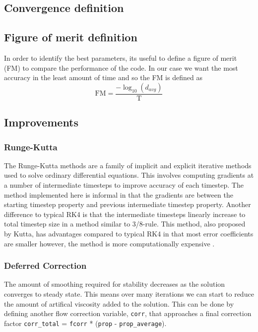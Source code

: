 \documentclass{article}
\begin{document}
\subsection{Convergence definition}

\subsection{Figure of merit definition}
In order to identify the best parameters, its useful to define a figure of merit (FM) to compare the performance of the code.
In our case we want the most accuracy in the least amount of time and so the FM is defined as
\begin{equation}
    \text{FM} = \frac{-\log_{10}(d_{avg})}{\text{T}}
\end{equation}

\subsection{Improvements}
\subsubsection{Runge-Kutta}

The Runge-Kutta methods are a family of implicit and explicit iterative methods used to solve ordinary differential equations.
This involves computing gradients at a number of intermediate timesteps to improve accuracy of each timestep.
The method implemented here is informal in that the gradients are between the starting timestep property and previous intermediate timestep property.
Another difference to typical RK4 is that the intermediate timesteps linearly increase to total timestep size in a method similar to 3/8-rule.
This method, also proposed by Kutta, has advantages compared to typical RK4 in that most error coefficients are smaller however, the method is more computationally expensive \cite{solve_ODE_nonstiff}.


\subsubsection{Deferred Correction}

The amount of smoothing required for stability decreases as the solution converges to steady state.
This means over many iterations we can start to reduce the amount of artifical viscosity added to the solution.
This can be done by defining another flow correction variable, \texttt{corr}, that approaches a final correction factor \texttt{corr\_total} = \texttt{fcorr} * (\texttt{prop} - \texttt{prop\_average}). 
\end{document}

